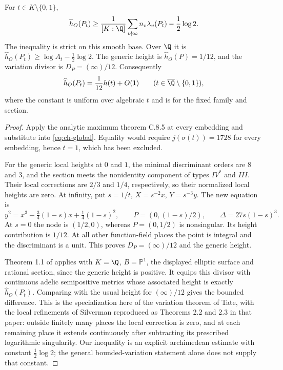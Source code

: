\begin{statement}
For $t\in K\setminus\{0,1\}$,
\begin{equation}\label{eq:ch-bound}
 \widehat h_O(P_t)\geq
 \frac1{[K:\Q]}\sum_{v\nmid\infty}n_v\lambda_v(P_t)
                    -\frac12\log2.
\end{equation}
The inequality is strict on this smooth base. Over $\Q$ it
is $\widehat h_O(P_t)\geq\log A_t-\frac12\log2$.
The generic height is $\widehat h_O(P)=1/12$, and the
variation divisor is $D_P=(\infty)/12$. Consequently
\[
 \widehat h_O(P_t)=\frac1{12}h(t)+O(1)
 \qquad(t\in\overline\Q\setminus\{0,1\}),
\]
where the constant is uniform over algebraic $t$ and is for
the fixed family and section.
\end{statement}
\begin{proof}
Apply the analytic maximum theorem C.8.5 at every embedding
and substitute into \eqref{eq:ch-global}. Equality would
require $j(\sigma(t))=1728$ for every embedding, hence $t=1$,
which has been excluded.

For the generic local heights at $0$ and $1$, the minimal
discriminant orders are $8$ and $3$, and the section meets
the nonidentity component of types $IV^*$ and $III$.
Their local corrections are $2/3$ and $1/4$, respectively,
so their normalized local heights are zero. At infinity,
put $s=1/t$, $X=s^{-2}x$, $Y=s^{-3}y$. The new equation is
\[
 y^2=x^3-\tfrac34(1-s)x+\tfrac14(1-s)^2,
 \qquad P=(0,(1-s)/2),\qquad\Delta=27s(1-s)^3.
\]
At $s=0$ the node is $(1/2,0)$, whereas $P=(0,1/2)$ is
nonsingular. Its height contribution is $1/12$.
At all other function-field places the point is integral
and the discriminant is a unit. This proves
$D_P=(\infty)/12$ and the generic height.

Theorem 1.1 of \citet{demarco2017} applies with $K=\Q$,
$B=\mathbb P^1$, the displayed elliptic surface and rational
section, since the generic height is positive. It equips
this divisor with continuous adelic semipositive metrics
whose associated height is exactly $\widehat h_O(P_t)$.
Comparing with the usual height for $(\infty)/12$ gives the
bounded difference. This is the specialization here of the
variation theorem of Tate, with the local refinements of
Silverman reproduced as Theorems 2.2 and 2.3 in that paper:
outside finitely many places the local correction is zero,
and at each remaining place it extends continuously after
subtracting its prescribed logarithmic singularity.
Our inequality is an explicit archimedean estimate with
constant $\frac12\log2$; the general bounded-variation
statement alone does not supply that constant.


\end{proof}
